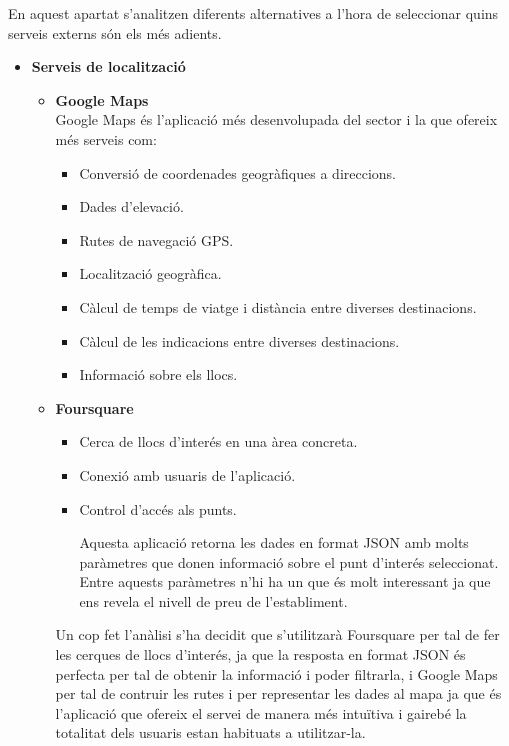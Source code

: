 En aquest apartat s’analitzen diferents alternatives a l’hora de seleccionar
quins serveis externs són els més adients.
\begin{itemize}
\item[]\textbf{Serveis de localització}
\begin{itemize}
\item{}\textbf{Google Maps}\\
Google Maps és l’aplicació més desenvolupada del sector i la que
ofereix més serveis com:
\begin{itemize}
\item{}Conversió de coordenades geogràfiques a direccions.
\item{}Dades d’elevació.
\item{}Rutes de navegació GPS.
\item{}Localització geogràfica.
\item{}Càlcul de temps de viatge i distància entre diverses destinacions.
\item{}Càlcul de les indicacions entre diverses destinacions.
\item{}Informació sobre els llocs.
\end{itemize}
\item{}\textbf{Foursquare}
\begin{itemize}
\item{}Cerca de llocs d’interés en una àrea concreta.
\item{}Conexió amb usuaris de l’aplicació.
\item{}Control d’accés als punts.

Aquesta aplicació retorna les dades en format JSON amb molts
paràmetres que donen informació sobre el punt d’interés seleccionat. Entre aquests paràmetres n’hi ha un que és molt interessant
ja que ens revela el nivell de preu de l’establiment.
\end{itemize}
Un cop fet l’anàlisi s’ha decidit que s’utilitzarà Foursquare per tal de
fer les cerques de llocs d’interés, ja que la resposta en format JSON
és perfecta per tal de obtenir la informació i poder filtrarla, i Google
Maps per tal de contruir les rutes i per representar les dades al mapa
ja que és l’aplicació que ofereix el servei de manera més intuïtiva i
gairebé la totalitat dels usuaris estan habituats a utilitzar-la.

\end{itemize}


\end{itemize}
